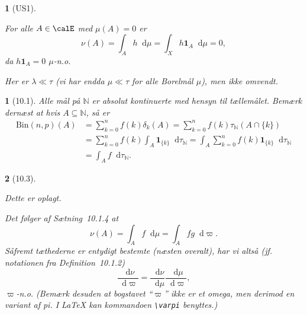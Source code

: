 \documentclass[a4paper, 11pt, article, danish, oneside]{memoir}
\newcommand{\naturals}{\mathbb{N}}
\newcommand{\dif}{\mathop{}\!\mathrm{d}}
\newcommand{\indicator}[1]{\mathbf{1}_{#1}}
\newcommand*\intersect\cap
\newcommand{\pencilsymbol}{\raisebox{-2pt}{\normalfont\PencilLeft}}
\theoremstyle{changedotcustomnumber}
\newtheorem{opgave}{\pencilsymbol}
\theoremstyle{changedotbreakcustomnumber}
\newtheorem{opgavebreak}{\pencilsymbol}
\begin{document}
\begin{opgavebreak}[US1]
\begin{solutionsec}
    \item For alle $A \in \calE$ med $\mu(A) = 0$ er
    \begin{equation*}
        \nu(A)
            = \int_A h \dif\mu
            = \int_X h \indicator{A} \dif\mu
            = 0,
    \end{equation*}
    da $h \indicator{A} = 0$ $\mu$-n.o.

    \item Her er $\lambda \ll \tau$ (vi har endda $\mu \ll \tau$ for alle Borelmål $\mu$), men ikke omvendt.
\end{solutionsec}
\end{opgavebreak}


\newcommand{\Bin}[2]{\mathrm{Bin}(#1,#2)}

\begin{opgave}[10.1]
    Alle mål på $\naturals$ er absolut kontinuerte med hensyn til tællemålet. Bemærk dernæst at hvis $A \subseteq \naturals$, så er
    \begin{align*}
        \Bin{n}{p}(A)
            &= \sum_{k=0}^n f(k) \delta_k(A)
             = \sum_{k=0}^n f(k) \tau_\naturals(A \intersect \{k\}) \\
            &= \sum_{k=0}^n f(k) \int_A \indicator{\{k\}} \dif\tau_\naturals
             = \int_A \sum_{k=0}^n f(k) \indicator{\{k\}} \dif\tau_\naturals \\
            &= \int_A f \dif\tau_\naturals.
    \end{align*}
\end{opgave}


\begin{opgavebreak}[10.3]
\begin{solutionsec}
    \item Dette er oplagt.

    \item Det følger af Sætning~10.1.4 at
    \begin{equation*}
        \nu(A)
            = \int_A f \dif\mu
            = \int_A fg \dif\varpi.
    \end{equation*}
    Såfremt tæthederne er entydigt bestemte (næsten overalt), har vi altså (jf. notationen fra Definition~10.1.2)
    \begin{equation*}
        \frac{\dif\nu}{\dif\varpi}
            = \frac{\dif\nu}{\dif\mu} \frac{\dif\mu}{\dif\varpi},
    \end{equation*}
    $\varpi$-n.o. (Bemærk desuden at bogstavet \enquote{$\varpi$} ikke er et omega, men derimod en variant af pi. I \LaTeX{} kan kommandoen \verb|\varpi| benyttes.)
\end{solutionsec}
\end{opgavebreak}
\end{document}
